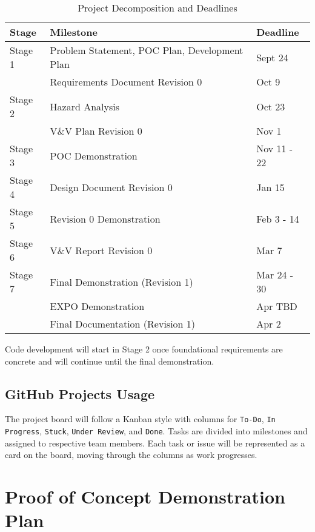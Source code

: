 \documentclass{article}
\begin{document}
\begin{table}[htbp]
    \centering
    \begin{tabular}{|l|l|l|}
    \hline
    \textbf{Stage} & \textbf{Milestone} & \textbf{Deadline} \\
    \hline
    Stage 1 & Problem Statement, POC Plan, Development Plan & Sept 24 \\
    \texttt{} & Requirements Document Revision 0 & Oct 9 \\
    \hline
    Stage 2 & Hazard Analysis & Oct 23 \\
    \texttt{} & V\&V Plan Revision 0 & Nov 1 \\
    \hline
    Stage 3 & POC Demonstration & Nov 11 - 22 \\
    \hline
    Stage 4 & Design Document Revision 0 & Jan 15 \\
    \hline
    Stage 5 & Revision 0 Demonstration & Feb 3 - 14\\
    \hline
    Stage 6 & V\&V Report Revision 0 & Mar 7 \\
    \hline
    Stage 7 & Final Demonstration (Revision 1) & Mar 24 - 30\\
    \texttt{} & EXPO Demonstration & Apr TBD \\
    \texttt{} & Final Documentation (Revision 1) & Apr 2 \\
    \hline
    \end{tabular}
    \caption{Project Decomposition and Deadlines}
    \label{table:2}
\end{table}

\noindent Code development will start in Stage 2 once foundational requirements are
concrete and will continue until the final demonstration.

\subsection{GitHub Projects Usage}

The project board will follow a Kanban style with columns for \texttt{To-Do},
\texttt{In Progress}, \texttt{Stuck}, \texttt{Under Review}, and \texttt{Done}.
Tasks are divided into milestones and assigned to respective team members. Each
task or issue will be represented as a card on the board, moving through the
columns as work progresses.

\section{Proof of Concept Demonstration Plan}
\end{document}
